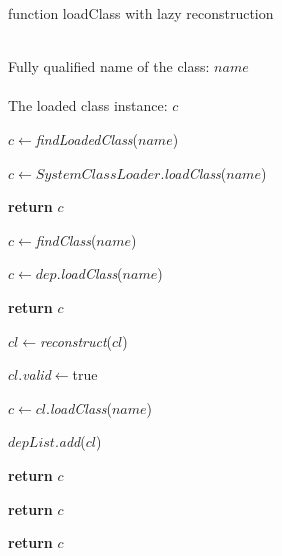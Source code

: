 \documentclass[conference]{IEEEtran}
\begin{document}
\begin{algorithm}[ht]
\caption{function loadClass with lazy reconstruction}
\label{alg:lazy_reconstruction}
\begin{algorithmic}[1]
\REQUIRE ~~\\
Fully qualified name of the class: $name$ \\

\ENSURE ~~\\
The loaded class instance: $c$

\STATE $c\leftarrow$\emph{findLoadedClass}($name$)

	
	
		\STATE $c\leftarrow SystemClassLoader.$\emph{loadClass}($name$)
	

			\STATE \textbf{return} $c$
	
		\ENDIF

	\ELSE

		\STATE $c\leftarrow$\emph{findClass}($name$)



				\STATE $c\leftarrow dep.$\emph{loadClass}($name$)

			
					\STATE \textbf{return} $c$

				\ENDIF
			
			\ENDFOR

				


					\STATE $cl\leftarrow$\emph{reconstruct}($cl$)
				
					\STATE $cl.$\emph{valid}$\leftarrow$true

				\ENDIF

				\STATE $c\leftarrow cl.$\emph{loadClass}($name$)


					\STATE $depList$.\emph{add}($cl$)
			
					\STATE \textbf{return} $c$

				\ENDIF
			
			\ENDFOR
	
	
		\ELSE

			\STATE \textbf{return} $c$

		\ENDIF

	\ENDIF

\ELSE

	\STATE \textbf{return} $c$

\ENDIF


\end{algorithmic}
\end{algorithm}
\end{document}
